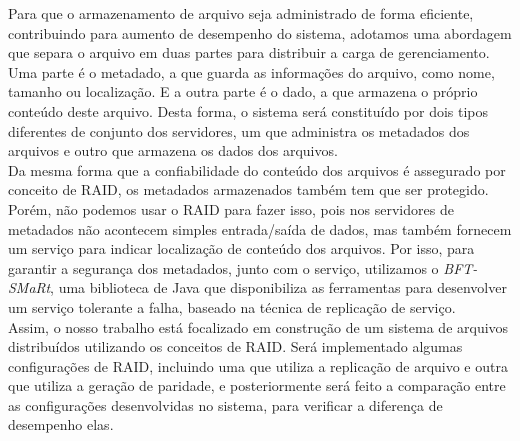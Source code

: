 Para que o armazenamento de arquivo seja administrado de forma eficiente, contribuindo para aumento de desempenho do sistema, adotamos uma abordagem que separa o arquivo em duas partes para distribuir a carga de gerenciamento. 
Uma parte é o metadado, a que guarda as informações do arquivo, como nome, tamanho ou localização. E a outra parte é o dado, a que armazena o próprio conteúdo deste arquivo. 
Desta forma, o sistema será constituído por dois tipos diferentes de conjunto dos servidores, um que administra os metadados dos arquivos e outro que armazena os dados dos arquivos. 
\\

Da mesma forma que a confiabilidade do conteúdo dos arquivos é assegurado por conceito de RAID, os metadados armazenados também tem que ser protegido.
Porém, não podemos usar o RAID para fazer isso, pois nos servidores de metadados não acontecem simples entrada/saída de dados, mas também fornecem um serviço para indicar localização de conteúdo dos arquivos. 
Por isso, para garantir a segurança dos metadados, junto com o serviço, utilizamos o \textit{BFT-SMaRt}, uma biblioteca de Java que disponibiliza as ferramentas para desenvolver um serviço tolerante a falha, baseado na técnica de replicação de serviço.
\\




Assim, o nosso trabalho está focalizado em construção de um sistema de arquivos distribuídos utilizando os conceitos de RAID.
Será implementado algumas configurações de RAID, incluindo uma que utiliza a replicação de arquivo e outra que utiliza a geração de paridade, e posteriormente será feito a comparação entre as configurações desenvolvidas no sistema, para verificar a diferença de desempenho elas.
\\











